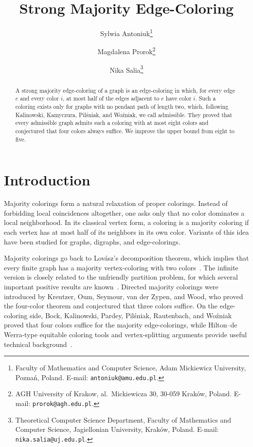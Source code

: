 \documentclass[11pt]{article}
\title{Strong Majority Edge-Coloring}
\author{
Sylwia Antoniuk\thanks{
Faculty of Mathematics and Computer Science, Adam Mickiewicz University, Pozna\'n, Poland.
E-mail: \texttt{antoniuk@amu.edu.pl}.
}
\and Magdalena Prorok\thanks{
AGH University of Krakow, al.~Mickiewicza 30, 30-059 Kraków, Poland. 
E-mail: \texttt{prorok@agh.edu.pl}.
}
\and Nika Salia\thanks{
Theoretical Computer Science Department, Faculty of Mathematics and Computer Science, 
Jagiellonian University, Kraków, Poland. 
E-mail: \texttt{nika.salia@uj.edu.pl}.
}
}
\date{}
\theoremstyle{definition}
\begin{document}
\maketitle

\begin{abstract}
A strong majority edge-coloring of a graph is an edge-coloring in which, for
every edge \(e\) and every color \(i\), at most half of the edges adjacent to \(e\) have color \(i\). Such a coloring exists only for graphs with no pendant path of length two, which, following Kalinowski, Kamyczura, Pilśniak,
and Woźniak, we call admissible. They proved that every admissible graph admits such a coloring with at most eight colors and conjectured that four colors always suffice. We improve the upper bound from eight to five.
\end{abstract}


\section{Introduction}

Majority colorings form a natural relaxation of proper colorings. Instead of forbidding local coincidences altogether, one asks only that no color dominates a local neighborhood. In its classical vertex form, a coloring is a majority coloring if each vertex has at most half of its neighbors in its own color.  Variants of this idea have been studied for graphs, digraphs, and edge-colorings.

Majority colorings go back to Lovász's decomposition theorem, which implies that every finite graph has a majority vertex-coloring with two colors~\cite{lovasz1966decomposition}.
The infinite version is closely related to the unfriendly partition problem, for which several important positive results are known~\cite{aharoni1990unfriendly,bruhn2010rayless,berger2017unfriendly,kalinowski2025unfriendly}.
Directed majority colorings were introduced by Kreutzer, Oum, Seymour, van der Zypen,
and Wood, who proved the four-color theorem and conjectured that three colors suffice.
On the edge-coloring side, Bock, Kalinowski, Pardey, Pilśniak, Rautenbach, and Woźniak~\cite{bock2023majority}
proved that four colors suffice for the majority edge-colorings, while Hilton--de Werra-type
equitable coloring tools and vertex-splitting arguments provide useful technical
background~\cite{hilton1994sufficient,hilton1998vertex}.
\end{document}
